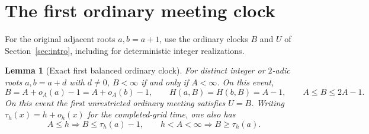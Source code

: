 \documentclass[11pt]{amsart}
\newtheorem{lemma}[theorem]{Lemma}
\theoremstyle{definition}
\theoremstyle{remark}
\begin{document}
\section{The first ordinary meeting clock}\label{sec:ordinary}

For the original adjacent roots $a,b=a+1$, use the ordinary clocks
$B$ and $U$ of Section~\ref{sec:intro}, including for deterministic
integer realizations.

\begin{lemma}[Exact first balanced ordinary clock]\label{ordinary:exactclock}
For distinct integer or $2$-adic roots $a,b=a+d$ with $d\ne0$, $B<\infty$ if and only
if $A<\infty$. On this event,
\[
 B=A+o_A(a)-1=A+o_A(b)-1,
 \qquad H(a,B)=H(b,B)=A-1,
 \qquad A\le B\le2A-1.
\]
On this event the first unrestricted ordinary meeting satisfies $U=B$.
Writing $\tau_h(x)=h+o_h(x)$ for the completed-grid time, one also has
\[
 A\le h\Longrightarrow B\le\tau_h(a)-1,
 \qquad h<A<\infty\Longrightarrow B\ge\tau_h(a).
\]
\end{lemma}
\end{document}
